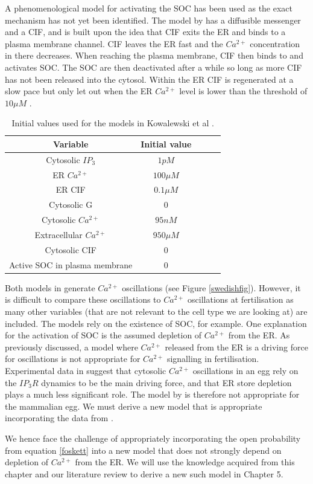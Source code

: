 A phenomenological model for activating the SOC has been used as the exact mechanism has not yet been identified. The model by  has a diffusible messenger and a CIF, and is built upon the idea that CIF exits the ER and binds to a plasma membrane channel. CIF leaves the ER fast and the $Ca^{2+}$ concentration in there decreases. When reaching the plasma membrane, CIF then binds to and activates SOC. The SOC are then deactivated after a while so long as more CIF has not been released into the cytosol. Within the ER CIF is regenerated at a slow pace but only let out when the ER $Ca^{2+}$ level is lower than the threshold of $10 \mu M$ \cite{swedish}.

\begin{table}[h!!!t!!!b!!!p]
\begin{center}
\begin{tabular}{ c c c c c}
Variable & Initial value\\
\hline
Cytosolic $IP_3$ & $1pM$ \\
\hline
ER $Ca^{2+}$ & $100 \mu M$\\
\hline
ER CIF & $0.1 \mu M$\\
\hline
Cytosolic G & $0$\\
\hline
Cytosolic $Ca^{2+}$ & $95 nM$\\
\hline
Extracellular $Ca^{2+}$ & $950 \mu M$\\
\hline
Cytosolic CIF & $0$\\
\hline
Active SOC in plasma membrane & $0$\\
\end{tabular}
\end{center}
\caption{Initial values used for the models in Kowalewski et al \cite{swedish}.}\label{swedishics}
\end{table}

 Both models in  generate $Ca^{2+}$ oscillations (see Figure \ref{swedishfig}). However, it is difficult to compare these oscillations to $Ca^{2+}$ oscillations at fertilisation as many other variables (that are not relevant to the cell type we are looking at) are included. The models rely on the existence of SOC, for example. One explanation for the activation of SOC is the assumed depletion of $Ca^{2+}$ from the ER. As previously discussed, a model where $Ca^{2+}$ released from the ER is a driving force for oscillations is not appropriate for $Ca^{2+}$ signalling in fertilisation. Experimental data in  {suggest} that cytosolic $Ca^{2+}$ oscillations in an egg rely on the $IP_3R$ dynamics to be the main driving force, and that ER store depletion plays a much less significant role. The model by  is therefore not appropriate for the mammalian egg. We must derive a new model that is appropriate incorporating the data from .

We hence face the challenge of  appropriately incorporating the open probability from equation \eqref{foskett} into a new model that does not strongly depend on depletion of $Ca^{2+}$ from the ER. We will use the knowledge acquired from this chapter and our literature review to derive a new such model in Chapter 5. 
